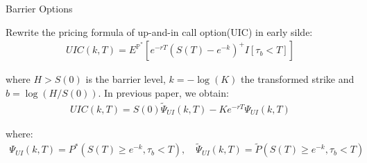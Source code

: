 \documentclass{beamer}
\begin{document}
\begin{frame}{Barrier Options}

    {\footnotesize \footnotesize
    \par Rewrite the pricing formula of up-and-in call option(UIC) in early silde:
    \begin{align*}
        UIC(k,T) = E^{\mathbb{P}^*} \left[ e^{-rT} \left( S(T) - e^{-k} \right)^+ I{[\tau_b < T]} \right]
    \end{align*}
    \par where \( H > S(0) \) is the barrier level, \( k = -\log(K) \) the transformed strike and \( b = \log(H/S(0)) \). In previous paper, we obtain:
    \begin{align*}
        UIC(k,T) = S(0) \tilde{\Psi}_{UI}(k,T) - Ke^{-rT} \Psi_{UI}(k,T)
    \end{align*}
    \par where:
    \begin{align*}
        \Psi_{UI}(k,T) = P^*(S(T) \geq e^{-k},  \tau_b < T), \quad \widetilde{\Psi}_{UI}(k,T) = \widetilde{P}(S(T) \geq e^{-k},  \tau_b < T) 
    \end{align*}
    }
    
\end{frame}
\end{document}

